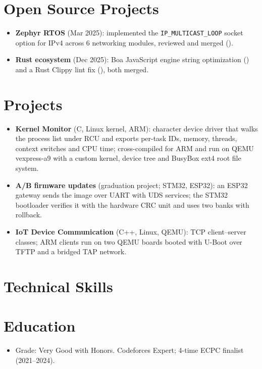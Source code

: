\documentclass[10pt]{article}
\begin{document}
\section*{Open Source Projects}
\begin{itemize}
  \item \textbf{Zephyr RTOS} (Mar 2025): implemented the \texttt{IP\_MULTICAST\_LOOP} socket option for IPv4 across 6 networking modules, reviewed and merged ().
  \item \textbf{Rust ecosystem} (Dec 2025): Boa JavaScript engine string optimization () and a Rust Clippy lint fix (), both merged.
\end{itemize}

\section*{Projects}
\begin{itemize}
  \item \textbf{Kernel Monitor} (C, Linux kernel, ARM): character device driver that walks the process list under RCU and exports per-task IDs, memory, threads, context switches and CPU time; cross-compiled for ARM and run on QEMU vexpress-a9 with a custom kernel, device tree and BusyBox ext4 root file system. 
  \item \textbf{A/B firmware updates} (graduation project; STM32, ESP32): an ESP32 gateway sends the image over UART with UDS services; the STM32 bootloader verifies it with the hardware CRC unit and uses two banks with rollback. 
  \item \textbf{IoT Device Communication} (C++, Linux, QEMU): TCP client--server classes; ARM clients run on two QEMU boards booted with U-Boot over TFTP and a bridged TAP network. 
\end{itemize}

\section*{Technical Skills}

\section*{Education}
\begin{itemize}
  \item Grade: Very Good with Honors. Codeforces Expert; 4-time ECPC finalist (2021--2024).
\end{itemize}
\end{document}
